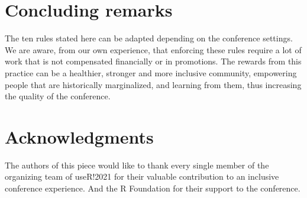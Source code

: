 \documentclass[10pt,letterpaper]{article}
\begin{document}
\section*{Concluding remarks}

The ten rules stated here can be adapted depending on the conference settings. We are aware, from our own experience, that enforcing these rules require a lot of work that is not compensated financially or in promotions. The rewards from this practice can be a healthier, stronger and more inclusive community, empowering people that are historically marginalized, and learning from them, thus increasing the quality of the conference. 


\section*{Acknowledgments}
The authors of this piece would like to thank every single member of the organizing team of useR!2021 for their valuable contribution to an inclusive conference experience. And the R Foundation for their support to the conference. 







\end{document}
